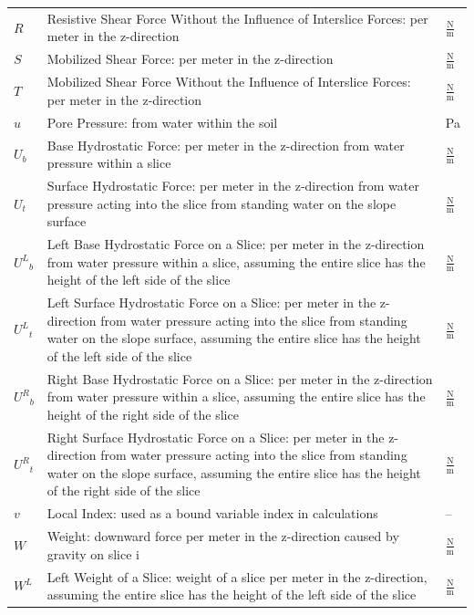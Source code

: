 \documentclass[12pt]{article}
\begin{document}
\begin{longtabu}{l X[l] l}
\\
$R$ & Resistive Shear Force Without the Influence of Interslice Forces: per meter in the z-direction & $\frac{\text{N}}{\text{m}}$
\\
$S$ & Mobilized Shear Force: per meter in the z-direction & $\frac{\text{N}}{\text{m}}$
\\
$T$ & Mobilized Shear Force Without the Influence of Interslice Forces: per meter in the z-direction & $\frac{\text{N}}{\text{m}}$
\\
$u$ & Pore Pressure: from water within the soil & Pa
\\
${U_{b}}$ & Base Hydrostatic Force: per meter in the z-direction from water pressure within a slice & $\frac{\text{N}}{\text{m}}$
\\
${U_{t}}$ & Surface Hydrostatic Force: per meter in the z-direction from water pressure acting into the slice from standing water on the slope surface & $\frac{\text{N}}{\text{m}}$
\\
${{U^{L}}_{b}}$ & Left Base Hydrostatic Force on a Slice: per meter in the z-direction from water pressure within a slice, assuming the entire slice has the height of the left side of the slice & $\frac{\text{N}}{\text{m}}$
\\
${{U^{L}}_{t}}$ & Left Surface Hydrostatic Force on a Slice: per meter in the z-direction from water pressure acting into the slice from standing water on the slope surface, assuming the entire slice has the height of the left side of the slice & $\frac{\text{N}}{\text{m}}$
\\
${{U^{R}}_{b}}$ & Right Base Hydrostatic Force on a Slice: per meter in the z-direction from water pressure within a slice, assuming the entire slice has the height of the right side of the slice & $\frac{\text{N}}{\text{m}}$
\\
${{U^{R}}_{t}}$ & Right Surface Hydrostatic Force on a Slice: per meter in the z-direction from water pressure acting into the slice from standing water on the slope surface, assuming the entire slice has the height of the right side of the slice & $\frac{\text{N}}{\text{m}}$
\\
$v$ & Local Index: used as a bound variable index in calculations & --
\\
$W$ & Weight: downward force per meter in the z-direction caused by gravity on slice i & $\frac{\text{N}}{\text{m}}$
\\
${W^{L}}$ & Left Weight of a Slice: weight of a slice per meter in the z-direction, assuming the entire slice has the height of the left side of the slice & $\frac{\text{N}}{\text{m}}$

\end{longtabu}
\end{document}
